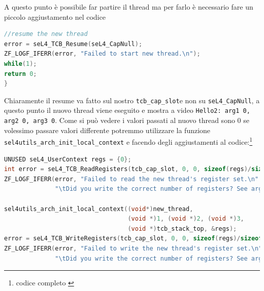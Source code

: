 A questo punto è possibile far partire il thread ma per farlo è necessario fare un piccolo aggiustamento nel codice 
\begin{lstlisting}[language=C++]
//resume the new thread
error = seL4_TCB_Resume(seL4_CapNull);
ZF_LOGF_IFERR(error, "Failed to start new thread.\n");
while(1);
return 0;
}
\end{lstlisting}
Chiaramente il resume va fatto sul nostro \texttt{tcb\_cap\_slot}e non su \texttt{seL4\_CapNull}, a questo punto il nuovo thread viene eseguito e mostra a video \texttt{Hello2: arg1 0, arg2 0, arg3 0}.
Come si può vedere i valori passati al nuovo thread sono 0 se volessimo passare valori differente potremmo utilizzare la funzione \texttt{sel4utils\_arch\_init\_local\_context} e facendo degli aggiustamenti al codice:\footnote{codice completo \cite{threads}}
\begin{lstlisting}[language=C++]
UNUSED seL4_UserContext regs = {0};
int error = seL4_TCB_ReadRegisters(tcb_cap_slot, 0, 0, sizeof(regs)/sizeof(seL4_Word), &regs);
ZF_LOGF_IFERR(error, "Failed to read the new thread's register set.\n"
              "\tDid you write the correct number of registers? See arg4.\n");

sel4utils_arch_init_local_context((void*)new_thread,
                                  (void *)1, (void *)2, (void *)3,
                                  (void *)tcb_stack_top, &regs);
error = seL4_TCB_WriteRegisters(tcb_cap_slot, 0, 0, sizeof(regs)/sizeof(seL4_Word), &regs);
ZF_LOGF_IFERR(error, "Failed to write the new thread's register set.\n"
              "\tDid you write the correct number of registers? See arg4.\n");
\end{lstlisting}

